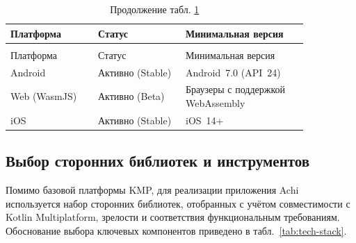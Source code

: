 \documentclass[../main.tex]{subfiles}
\begin{document}
\begin{small}
\begin{longtable}[t]{
	|>{\raggedright}p{0.25\linewidth} |
	>{\raggedright}p{0.25\linewidth} |
	>{\raggedright\arraybackslash}p{0.35\linewidth}|
}

\caption{Целевые платформы приложения Achi} \label{tab:platforms}\\
\midrule
Платформа & Статус & Минимальная версия \\
\midrule
\endfirsthead

\caption*{Продолжение табл. \ref{tab:platforms}\raggedleft}\\\midrule
Платформа & Статус & Минимальная версия \\
\midrule
\endhead

\endfoot
\midrule
\endlastfoot

Android & Активно (Stable) & Android~7.0 (API~24) \\
\midrule
Web (WasmJS) & Активно (Beta) & Браузеры с поддержкой WebAssembly \\
\midrule
iOS & Активно (Stable) & iOS~14+ \\

\end{longtable}
\end{small}

\subsection{Выбор сторонних библиотек и инструментов}

Помимо базовой платформы KMP, для реализации приложения Achi используется набор сторонних библиотек, отобранных с учётом совместимости с Kotlin Multiplatform, зрелости и соответствия функциональным требованиям. Обоснование выбора ключевых компонентов приведено в табл.~\ref{tab:tech-stack}.
\end{document}
